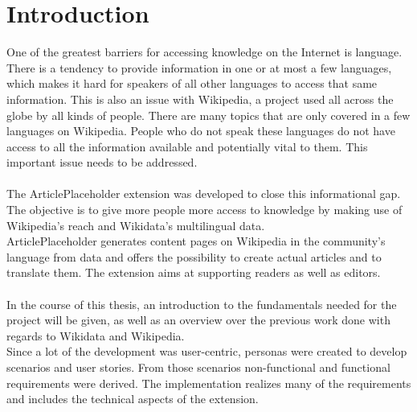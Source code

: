\chapter{Introduction}

One of the greatest barriers for accessing knowledge on the Internet is language. There is a tendency to provide information in one or at most a few languages, which makes it hard for speakers of all other languages to access that same information. This is also an issue with Wikipedia, a project used all across the globe by all kinds of people. There are many topics that are only covered in a few languages on Wikipedia. People who do not speak these languages do not have access to all the information available and potentially vital to them. This important issue needs to be addressed. \\
\\
The ArticlePlaceholder extension was developed to close this informational gap. The objective is to give more people more access to knowledge by making use of Wikipedia’s reach and Wikidata’s multilingual data. \\
ArticlePlaceholder generates content pages on Wikipedia in the community's language from data and offers the possibility to create actual articles and to translate them. The extension aims at supporting readers as well as editors. \\
\\
In the course of this thesis, an introduction to the fundamentals needed for the project will be given, as well as an overview over the previous work done with regards to Wikidata and Wikipedia. \\
Since a lot of the development was user-centric, personas were created to develop scenarios and user stories. From those scenarios non-functional and functional requirements were derived. The implementation realizes many of the requirements and includes the technical aspects of the extension.
